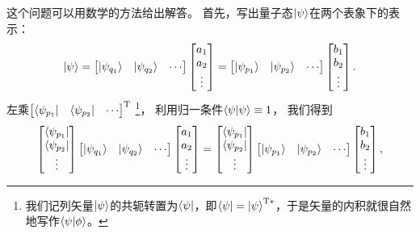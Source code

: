 这个问题可以用数学的方法给出解答。
首先，写出量子态$\ket{\psi}$在两个表象下的表示：
\begin{equation}
    \ket{\psi} =
    \begin{bmatrix}
        \ket{\psi_{q_1}} & \ket{\psi_{q_2}} & \cdots
    \end{bmatrix}
    \begin{bmatrix}
        a_1 \\ a_2 \\ \vdots
    \end{bmatrix}
    =
    \begin{bmatrix}
        \ket{\psi_{p_1}} & \ket{\psi_{p_2}} & \cdots
    \end{bmatrix}
    \begin{bmatrix}
        b_1 \\ b_2 \\ \vdots
    \end{bmatrix}.
\end{equation}
左乘$
\begin{bmatrix}
    \bra{\psi_{p_1}} & \bra{\psi_{p_2}} & \cdots
\end{bmatrix}^{\mathrm{T}}$
\footnote{我们记列矢量$\ket{\psi}$的共轭转置为$\bra{\psi}$，即$\bra{\psi}=\ket{\psi}^{\mathrm{T}*}$，于是矢量的内积就很自然地写作$\braket{\psi}{\phi}$。}，
利用归一条件$\braket{\psi}{\psi}\equiv 1$，
我们得到
\begin{equation}
    \begin{bmatrix}
        \bra{\psi_{p_1}} \\ \bra{\psi_{p_2}} \\ \vdots
    \end{bmatrix}
    \begin{bmatrix}
        \ket{\psi_{q_1}} & \ket{\psi_{q_2}} & \cdots
    \end{bmatrix}
    \begin{bmatrix}
        a_1 \\ a_2 \\ \vdots
    \end{bmatrix}
    =
    \begin{bmatrix}
        \bra{\psi_{p_1}} \\ \bra{\psi_{p_2}} \\ \vdots
    \end{bmatrix}
    \begin{bmatrix}
        \ket{\psi_{p_1}} & \ket{\psi_{p_2}} & \cdots
    \end{bmatrix}
    \begin{bmatrix}
        b_1 \\ b_2 \\ \vdots
    \end{bmatrix},
\end{equation}
